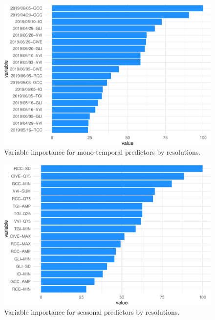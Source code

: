 \documentclass[]{article}
\begin{document}
\begin{figure}[H]

{\centering \includegraphics{report_files/figure-latex/var_imp_indices-1} 

}

\caption{Variable importance for mono-temporal predictors by resolutions.}\label{fig:var_imp_indices}
\end{figure}

\begin{figure}[H]

{\centering \includegraphics{report_files/figure-latex/var_imp_season-1} 

}

\caption{Variable importance for seasonal predictors by resolutions.}\label{fig:var_imp_season}
\end{figure}
\end{document}
